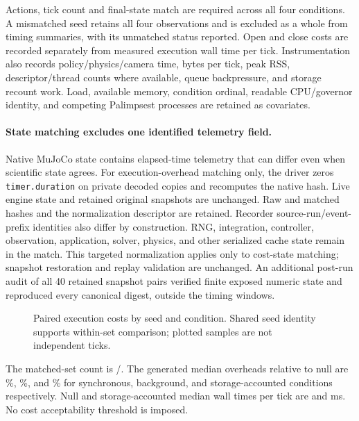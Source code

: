 \documentclass[10pt]{article}
\newcommand{\studyinput}[1]{}
\begin{document}
Actions, tick count and final-state match are required across all four
conditions. A mismatched seed retains all four observations and is excluded as
a whole from timing summaries, with its unmatched status reported. Open and
close costs are recorded separately from measured execution wall time per tick.
Instrumentation also records policy/physics/camera time, bytes per tick, peak
RSS, descriptor/thread counts where available, queue backpressure, and storage
recount work. Load, available memory, condition ordinal, readable CPU/governor
identity, and competing Palimpsest processes are retained as covariates.

\paragraph{State matching excludes one identified telemetry field.}
Native MuJoCo state contains elapsed-time telemetry that can differ even when
scientific state agrees. For execution-overhead matching only, the driver zeros
\texttt{timer.duration} on private decoded copies and recomputes the native
hash. Live engine state and retained original snapshots are unchanged. Raw and
matched hashes and the normalization descriptor are retained. Recorder
source-run/event-prefix identities also differ by construction. RNG,
integration, controller, observation, application, solver, physics, and other
serialized cache state remain in the match. This targeted normalization applies
only to cost-state matching; snapshot restoration and replay validation are unchanged.
An additional post-run audit of all 40 retained snapshot pairs verified finite
exposed numeric state and reproduced every canonical digest, outside the timing
windows.

\begin{table}[t]
\centering\small
\caption{Matched execution cost. All four conditions for a seed enter or leave
the timing summary together. Open and close costs are separate from measured
tick time. IQR (pp) is the interquartile range in percentage points.}
\label{tab:overhead}\studyinput{overhead-table}
\end{table}
\begin{figure}[t]
\centering\studyinput{overhead-plot}
\caption{Paired execution costs by seed and condition. Shared seed identity
supports within-set comparison; plotted samples are not independent ticks.}
\label{fig:overhead}
\end{figure}

The matched-set count is \OverheadMatchedSeeds{}/\OverheadDeclaredSeeds{}.
The generated median overheads relative to null are
\SynchronousOverheadMedian{}\%, \BackgroundOverheadMedian{}\%, and
\StorageOverheadMedian{}\% for synchronous, background, and storage-accounted
conditions respectively. Null and storage-accounted median wall times per tick
are \NullWallMedianMs{} and \StorageWallMedianMs{} ms. No cost acceptability
threshold is imposed.
\end{document}
